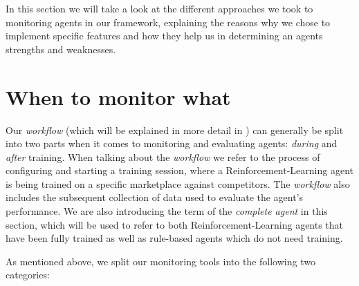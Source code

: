 \begin{jointwork}\label{ch:Approaches}
	In this section we will take a look at the different approaches we took to monitoring agents in our framework, explaining the reasons why we chose to implement specific features and how they help us in determining an agents strengths and weaknesses.
\end{jointwork}

\section{When to monitor what}\label{sec:WhenToMonitorWhat}

Our \emph{workflow} (which will be explained in more detail in ) can generally be split into two parts when it comes to monitoring and evaluating agents: \emph{during} and \emph{after} training. When talking about the \emph{workflow} we refer to the process of configuring and starting a training session, where a Reinforcement-Learning agent is being trained on a specific marketplace against competitors. The \emph{workflow} also includes the subsequent collection of data used to evaluate the agent's performance. We are also introducing the term of the \emph{complete agent} in this section, which will be used to refer to both Reinforcement-Learning agents that have been fully trained as well as rule-based agents which do not need training.

As mentioned above, we split our monitoring tools into the following two categories:


